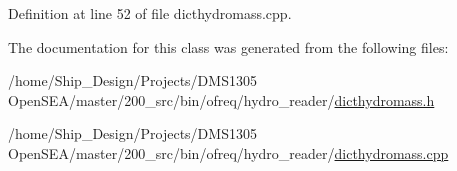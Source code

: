 Definition at line 52 of file dicthydromass.\-cpp.



The documentation for this class was generated from the following files\-:\begin{DoxyCompactItemize}
\item 
/home/\-Ship\-\_\-\-Design/\-Projects/\-D\-M\-S1305 Open\-S\-E\-A/master/200\-\_\-src/bin/ofreq/hydro\-\_\-reader/\hyperlink{dicthydromass_8h}{dicthydromass.\-h}\item 
/home/\-Ship\-\_\-\-Design/\-Projects/\-D\-M\-S1305 Open\-S\-E\-A/master/200\-\_\-src/bin/ofreq/hydro\-\_\-reader/\hyperlink{dicthydromass_8cpp}{dicthydromass.\-cpp}\end{DoxyCompactItemize}
